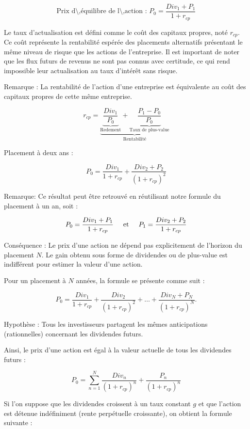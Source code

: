 \documentclass[a4paper, 12pt]{report}
\begin{document}
\[ \text{Prix d\'\,équilibre de l\'\,action : }P_0 =\frac{Div_1 + P_1}{1+r_{cp}} \]

Le taux d'actualisation est défini comme le coût des capitaux propres, noté \( r_{cp} \). Ce coût représente la rentabilité espérée des placements alternatifs présentant le même niveau de risque que les actions de l'entreprise. Il est important de noter que les flux futurs de revenus ne sont pas connus avec certitude, ce qui rend impossible leur actualisation au taux d'intérêt sans risque.

Remarque : La rentabilité de l'action d'une entreprise est équivalente au coût des capitaux propres de cette même entreprise.

\[ r_{cp}=\underbrace{\underbrace{\frac{Div_1}{P_0}}_{\text{Redement}}+\underbrace{\frac{P_1-P_0}{P_0}}_{\text{Taux de plus-value}}}_{\text{Rentabilité}} \]

Placement à deux  ans :

\[ P_0=\frac{Div_1}{1 + r_{cp}}+\frac{Div_2+P_2}{(1 + r_{cp})^2} \]

Remarque: Ce résultat peut être retrouvé en réutilisant notre formule du placement à un an, soit :

\[
P_0 = \frac{Div_1 + P_1}{1 + r_{cp}} \hspace{0.5cm} \text{et}\hspace{0.5cm} P_1 = \frac{Div_2 + P_2}{1 + r_{cp}} 
\]

Conséquence : Le prix d'une action ne dépend pas explicitement de l'horizon du placement \( N \). Le gain obtenu sous forme de dividendes ou de plus-value est indifférent pour estimer la valeur d'une action.

Pour un placement à \( N \) années, la formule se présente comme suit :

\[
P_0 = \frac{Div_1}{1 + r_{cp}} + \frac{Div_2}{(1 + r_{cp})^2} + \ldots + \frac{Div_N + P_N}{(1 + r_{cp})^N}.
\]

Hypothèse : Tous les investisseurs partagent les mêmes anticipations (rationnelles) concernant les dividendes futurs. 

Ainsi, le prix d'une action est égal à la valeur actuelle de tous les dividendes futurs :

\[
P_0 = \sum_{n=1}^{N} \frac{Div_n}{(1 + r_{cp})^n}+\frac{P_n}{(1 + r_{cp})^n}
\]

Si l'on suppose que les dividendes croissent à un taux constant \( g \) et que l'action est détenue indéfiniment (rente perpétuelle croissante), on obtient la formule suivante :
\end{document}

